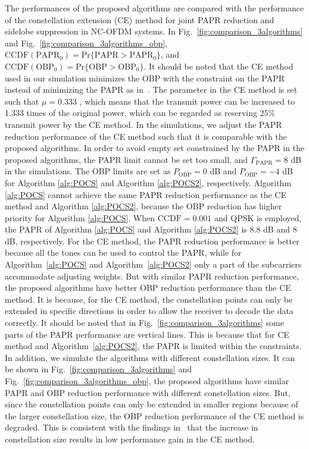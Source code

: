 \documentclass[paper]{ieice}
\begin{document}
The performances of the proposed algorithms are compared with the performance of the constellation extension (CE) method for joint PAPR reduction and sidelobe suppression in NC-OFDM systems. In Fig.~\ref{fig:comparison_3algorithms} and Fig.~\ref{fig:comparison_3algorithms_obp}, $\mathrm{CCDF}(\mathrm{PAPR}_{0}) = \mathrm{Pr}\{\mathrm{PAPR} > \mathrm{PAPR}_{0}\}$, and $\mathrm{CCDF}( \mathrm{OBP}_{0}) = \mathrm{Pr}\{\mathrm{OBP} > \mathrm{OBP}_{0}\}$. It should be noted that the CE method used in our simulation minimizes the OBP with the constraint on the PAPR instead of minimizing the PAPR as in~\cite{ni2015joint}. The parameter in the CE method is set such that $\mu = 0.333$ , which means that the transmit power can be increased to 1.333 times of the original power, which can be regarded as reserving $25\%$ transmit power by the CE method. In the simulations, we adjust the PAPR reduction performance of the CE method such that it is comparable with the proposed algorithms. In order to avoid empty set constrained
by the PAPR in the proposed algorithms, the PAPR limit cannot be set too small, and $\Gamma_{\mathrm{PAPR}} = 8$ dB in the simulations. The OBP limits are set as $P_{\mathrm{OBP}} = 0$ dB and  $P_{\mathrm{OBP}} = -4$ dB for Algorithm \ref{alg:POCS} and Algorithm \ref{alg:POCS2}, respectively. Algorithm \ref{alg:POCS} cannot achieve the same PAPR reduction performance as the CE method and Algorithm \ref{alg:POCS2}, because the OBP reduction has higher priority for Algorithm \ref{alg:POCS}. When
$\mathrm{CCDF} = 0.001$ and QPSK is employed, the PAPR of Algorithm \ref{alg:POCS} and Algorithm \ref{alg:POCS2} is $8.8$ dB and $8$ dB, respectively. For the CE method, the PAPR reduction performance is better because all the tones can be used to control the PAPR, while for Algorithm~\ref{alg:POCS} and Algorithm~\ref{alg:POCS2} only a part of the subcarriers accommodate adjusting weights. But with similar PAPR reduction performance, the proposed algorithms have better OBP reduction performance than the CE method. It is because, for the CE method, the constellation points can only be extended in specific directions in order to allow the receiver to decode the data correctly. It should be noted that in Fig.~\ref{fig:comparison_3algorithms} some parts of the PAPR performance are vertical lines. This is because that for CE method and Algorithm~\ref{alg:POCS2}, the PAPR is limited within the constraints. In addition, we simulate the algorithms with different constellation sizes. It can be shown in Fig.~\ref{fig:comparison_3algorithms} and Fig.~\ref{fig:comparison_3algorithms_obp}, the proposed algorithms have similar PAPR and OBP reduction performance with different constellation sizes. But, since the constellation points can only be extended in smaller regions because of the larger constellation size, the OBP reduction performance of the CE method is degraded. This is consistent with the findings in~\cite{1202695} that the increase in constellation size results in low
performance gain in the CE method.
\end{document}
